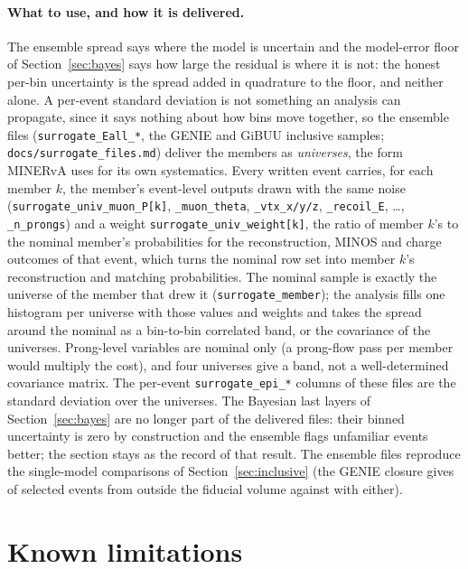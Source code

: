 \documentclass[11pt]{article}
\begin{document}
\paragraph{What to use, and how it is delivered.} The ensemble spread says where the model is uncertain and the
model-error floor of Section~\ref{sec:bayes} says how large the residual is where it is not: the honest per-bin
uncertainty is the spread added in quadrature to the floor, and neither alone. A per-event standard deviation is
not something an analysis can propagate, since it says nothing about how bins move together, so the ensemble
files (\texttt{surrogate\_Eall\_*}, the GENIE and GiBUU inclusive samples; \texttt{docs/surrogate\_files.md})
deliver the members as \emph{universes}, the form MINERvA uses for its own systematics. Every written event
carries, for each member $k$, the member's event-level outputs drawn with the same noise
(\texttt{surrogate\_univ\_muon\_P[k]}, \texttt{\_muon\_theta}, \texttt{\_vtx\_x/y/z}, \texttt{\_recoil\_E},
\ldots, \texttt{\_n\_prongs}) and a weight \texttt{surrogate\_univ\_weight[k]}, the ratio of member $k$'s to the
nominal member's probabilities for the reconstruction, MINOS and charge outcomes of that event, which turns the
nominal row set into member $k$'s reconstruction and matching probabilities. The nominal sample is exactly the
universe of the member that drew it (\texttt{surrogate\_member}); the analysis fills one histogram per universe
with those values and weights and takes the spread around the nominal as a bin-to-bin correlated band, or the
covariance of the universes. Prong-level variables are nominal only (a prong-flow pass per member would multiply
the cost), and four universes give a band, not a well-determined covariance matrix. The per-event
\texttt{surrogate\_epi\_*} columns of these files are the standard deviation over the universes. The Bayesian
last layers of Section~\ref{sec:bayes} are no longer part of the delivered files: their binned uncertainty is
zero by construction and the ensemble flags unfamiliar events better; the section stays as the record of that
result. The ensemble files reproduce the single-model comparisons of Section~\ref{sec:inclusive} (the GENIE closure
gives \nIncGBGenOutFrac{} of selected events from outside the fiducial volume against \nIncGBRefOutFrac{} with
either).
\FloatBarrier

\section{Known limitations}
\label{sec:limits}
\end{document}
